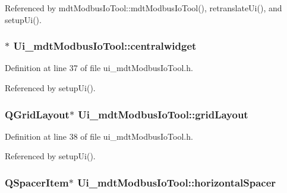 Referenced by mdt\-Modbus\-Io\-Tool\-::mdt\-Modbus\-Io\-Tool(), retranslate\-Ui(), and setup\-Ui().

\hypertarget{class_ui__mdt_modbus_io_tool_a444ded6af2f013d65668cefc2159b0f9}{
\subsubsection[{centralwidget}]{$\ast$ Ui\-\_\-mdt\-Modbus\-Io\-Tool\-::centralwidget}}\label{class_ui__mdt_modbus_io_tool_a444ded6af2f013d65668cefc2159b0f9}


Definition at line 37 of file ui\-\_\-mdt\-Modbus\-Io\-Tool.\-h.



Referenced by setup\-Ui().

\hypertarget{class_ui__mdt_modbus_io_tool_a789ef6fb3f339bf1b6e982f7a7ba5b52}{
\subsubsection[{grid\-Layout}]{\setlength{\rightskip}{0pt plus 5cm}Q\-Grid\-Layout$\ast$ Ui\-\_\-mdt\-Modbus\-Io\-Tool\-::grid\-Layout}}\label{class_ui__mdt_modbus_io_tool_a789ef6fb3f339bf1b6e982f7a7ba5b52}


Definition at line 38 of file ui\-\_\-mdt\-Modbus\-Io\-Tool.\-h.



Referenced by setup\-Ui().

\hypertarget{class_ui__mdt_modbus_io_tool_a66418b60c043ae70465930e69e88e63b}{
\subsubsection[{horizontal\-Spacer}]{\setlength{\rightskip}{0pt plus 5cm}Q\-Spacer\-Item$\ast$ Ui\-\_\-mdt\-Modbus\-Io\-Tool\-::horizontal\-Spacer}}\label{class_ui__mdt_modbus_io_tool_a66418b60c043ae70465930e69e88e63b}


